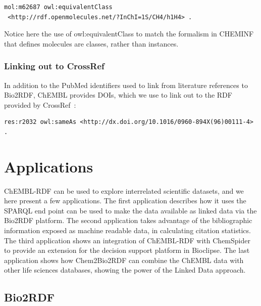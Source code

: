 \documentclass[10pt]{bmc_article}
\newenvironment{bmcformat}{\begin{raggedright}\baselineskip20pt\sloppy\setboolean{publ}{false}}{\end{raggedright}\baselineskip20pt\sloppy}
\begin{document}
\begin{bmcformat}
\begin{small}
\begin{verbatim}
mol:m62687 owl:equivalentClass
 <http://rdf.openmolecules.net/?InChI=1S/CH4/h1H4> .
\end{verbatim}
\end{small}

Notice here the use of owl:equivalentClass to match the formalism in CHEMINF that defines molecules
are classes, rather than instances.

\subsubsection*{Linking out to CrossRef}

In addition to the PubMed identifiers used to link from literature references to Bio2RDF,
ChEMBL provides DOIs, which we use to link out to the RDF provided by CrossRef~\cite{Bilder2011}:

\begin{small}
\begin{verbatim}
res:r2032 owl:sameAs <http://dx.doi.org/10.1016/0960-894X(96)00111-4> .
\end{verbatim}
\end{small}

\section*{Applications}

ChEMBL-RDF can be used to explore interrelated scientific datasets, and we here present a few applications. 
The first application describes how it uses the SPARQL end point can be used to make the data available as linked data
via the Bio2RDF platform. The second application takes advantage of the bibliographic information
exposed as machine readable data, in calculating citation statistics. The third application shows
an integration of ChEMBL-RDF with ChemSpider to provide an extension for the decision support
platform in Bioclipse. The last application shows how Chem2Bio2RDF can combine the ChEMBL data
with other life sciences databases, showing the power of the Linked Data approach.

\subsection*{Bio2RDF}


\end{bmcformat}
\end{document}

